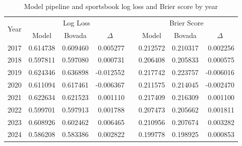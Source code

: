 \documentclass[12pt,twoside]{report}
\begin{document}
\begin{table}[!htb]
\centering
\begin{tabular}{@{}cccrcccr@{}}
\toprule
\multirow{2}{*}{Year} & \multicolumn{3}{c}{Log Loss}                                                               & \multirow{2}{*}{}    & \multicolumn{3}{c}{Brier Score}                    \\ \cmidrule(lr){2-4} \cmidrule(l){6-8} 
                      & Model                        & Bovada                       & \multicolumn{1}{c}{$\Delta$} &                      & Model    & Bovada   & \multicolumn{1}{c}{$\Delta$} \\ \midrule
2017                  & 0.614738                     & 0.609460                     & 0.005277                     &                      & 0.212572 & 0.210317 & 0.002256                     \\
2018                  & \multicolumn{1}{l}{0.597811} & \multicolumn{1}{l}{0.597080} & 0.000731                     & \multicolumn{1}{l}{} & 0.206408 & 0.205833 & 0.000575                     \\
2019                  & 0.624346                     & 0.636898                     & -0.012552                    &                      & 0.217742 & 0.223757 & -0.006016                    \\
2020                  & 0.611094                     & 0.617461                     & -0.006367                    &                      & 0.211575 & 0.214045 & -0.002470                    \\
2021                  & 0.622634                     & 0.621523                     & 0.001110                     &                      & 0.217409 & 0.216309 & 0.001100                     \\
2022                  & 0.599701                     & 0.597913                     & 0.001788                     &                      & 0.207473 & 0.205662 & 0.001811                     \\
2023                  & 0.608926                     & 0.602462                     & 0.006465                     &                      & 0.210956 & 0.207674 & 0.003282                     \\
2024                  & 0.586208                     & 0.583386                     & 0.002822                     &                      & 0.199778 & 0.198925 & 0.000853                     \\ \bottomrule
\end{tabular}
\caption{Model pipeline and sportsbook log loss and Brier score by year}
\label{case_study_by_year}
\end{table}
\end{document}
